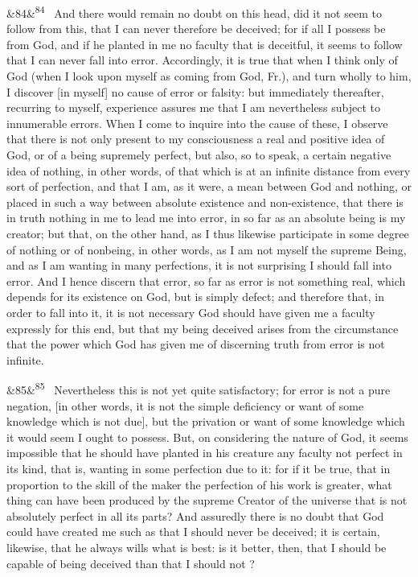 \documentclass[12pt]{article}
\newcommand{\para}[1][]{\par\noindent\ifx&#1&\else\textsuperscript{\footnotesize #1}~\fi}
\begin{document}
\para[84] And there would remain no doubt on this head, did it not seem to follow from this, that I can never therefore be deceived; for if all I possess be from God, and if he planted in me no faculty that is deceitful, it seems to follow that I can never fall into error. Accordingly, it is true that when I think only of God (when I look upon myself as coming from God, Fr.), and turn wholly to him, I discover [in myself] no cause of error or falsity: but immediately thereafter, recurring to myself, experience assures me that I am nevertheless subject to innumerable errors. When I come to inquire into the cause of these, I observe that there is not only present to my consciousness a real and positive idea of God, or of a being supremely perfect, but also, so to speak, a certain negative idea of nothing, in other words, of that which is at an infinite distance from every sort of perfection, and that I am, as it were, a mean between God and nothing, or placed in such a way between absolute existence and non-existence, that there is in truth nothing in me to lead me into error, in so far as an absolute being is my creator; but that, on the other hand, as I thus likewise participate in some degree of nothing or of nonbeing, in other words, as I am not myself the supreme Being, and as I am wanting in many perfections, it is not surprising I should fall into error. And I hence discern that error, so far as error is not something real, which depends for its existence on God, but is simply defect; and therefore that, in order to fall into it, it is not necessary God should have given me a faculty expressly for this end, but that my being deceived arises from the circumstance that the power which God has given me of discerning truth from error is not infinite.

\para[85] Nevertheless this is not yet quite satisfactory; for error is not a pure negation, [in other words, it is not the simple deficiency or want of some knowledge which is not due], but the privation or want of some knowledge which it would seem I ought to possess. But, on considering the nature of God, it seems impossible that he should have planted in his creature any faculty not perfect in its kind, that is, wanting in some perfection due to it: for if it be true, that in proportion to the skill of the maker the perfection of his work is greater, what thing can have been produced by the supreme Creator of the universe that is not absolutely perfect in all its parts? And assuredly there is no doubt that God could have created me such as that I should never be deceived; it is certain, likewise, that he always wills what is best: is it better, then, that I should be capable of being deceived than that I should not ?
\end{document}
